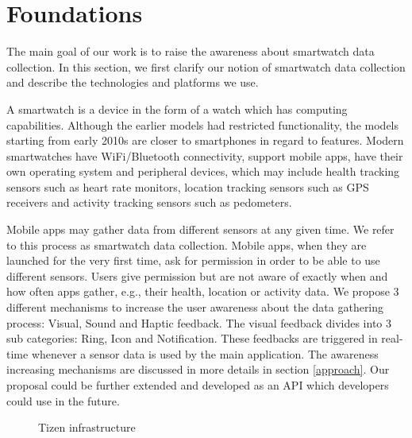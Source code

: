 \documentclass[conference, a4paper, 10pt, twocolumn]{IEEEtran}
\begin{document}
\section{\textbf{Foundations}}\label{foundations}

The main goal of our work is to raise the awareness about smartwatch data collection. In this section, we first clarify our notion of smartwatch data collection and describe the technologies and platforms we use. 

A smartwatch is a device in the form of a watch which has computing capabilities. Although the earlier models had restricted functionality, the models starting from early 2010s are closer to smartphones in regard to features. Modern smartwatches have WiFi/Bluetooth connectivity, support mobile apps, have their own operating system and peripheral devices, which may include health tracking sensors such as heart rate monitors, location tracking sensors such as GPS receivers and activity tracking sensors such as pedometers.\cite{smartwatch}

Mobile apps may gather data from different sensors at any given time. We refer to this process as smartwatch data collection. Mobile apps, when they are launched for the very first time, ask for permission in order to be able to use different sensors. Users give permission but are not aware of exactly when and how often apps gather, e.g., their health, location or activity data. We propose 3 different mechanisms to increase the user awareness about the data gathering process: Visual, Sound and Haptic feedback. The visual feedback divides into 3 sub categories: Ring, Icon and Notification. These feedbacks are triggered in real-time whenever a sensor data is used by the main application. The awareness increasing mechanisms are discussed in more details in section \ref{approach}. Our proposal could be further extended and developed as an API which developers could use in the future.

\begin{figure}[t]
\caption{Tizen infrastructure~\cite{tizen}}
\label{fig:tizen}
\end{figure}
\end{document}
